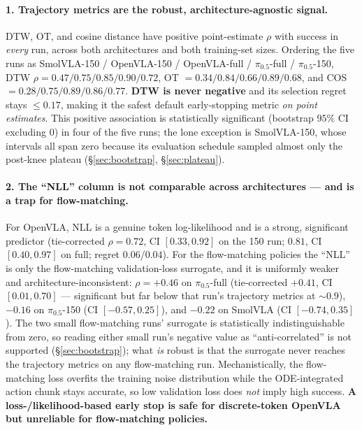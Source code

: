 \documentclass[11pt]{article}
\begin{document}
\paragraph{1. Trajectory metrics are the robust, architecture-agnostic signal.}
DTW, OT, and cosine distance have positive point-estimate $\rho$ with success in \emph{every} run, across
both architectures and both training-set sizes. Ordering the five runs as
SmolVLA-150 / OpenVLA-150 / OpenVLA-full / $\pi_{0.5}$-full / $\pi_{0.5}$-150,
DTW $\rho = 0.47/0.75/0.85/0.90/0.72$, OT $= 0.34/0.84/0.66/0.89/0.68$, and
COS $= 0.28/0.75/0.89/0.86/0.77$. \textbf{DTW is never negative} and its selection regret stays
$\le 0.17$, making it the safest default early-stopping metric \emph{on point estimates}. This positive
association is statistically significant (bootstrap $95\%$ CI excluding $0$) in four of the five runs;
the lone exception is SmolVLA-150, whose intervals all span zero because its evaluation schedule sampled
almost only the post-knee plateau (\S\ref{sec:bootstrap}, \S\ref{sec:plateau}).

\paragraph{2. The ``NLL'' column is not comparable across architectures --- and is a trap for
flow-matching.}
For OpenVLA, NLL is a genuine token log-likelihood and is a strong, significant predictor (tie-corrected
$\rho{=}0.72$, CI $[0.33,0.92]$ on the 150 run; $0.81$, CI $[0.40,0.97]$ on full; regret $0.06$/$0.04$).
For the flow-matching policies the ``NLL'' is only the flow-matching validation-loss surrogate, and it is
uniformly weaker and architecture-inconsistent: $\rho{=}{+}0.46$ on $\pi_{0.5}$-full (tie-corrected
${+}0.41$, CI $[0.01,0.70]$ --- significant but far below that run's trajectory metrics at $\sim\!0.9$),
${-}0.16$ on $\pi_{0.5}$-150 (CI $[-0.57,0.25]$), and $-0.22$ on SmolVLA (CI $[-0.74,0.35]$). The two small
flow-matching runs' surrogate is statistically indistinguishable from zero, so reading either small run's
negative value as ``anti-correlated'' is not supported (\S\ref{sec:bootstrap}); what \emph{is} robust is that the
surrogate never reaches the trajectory metrics on any flow-matching run. Mechanistically, the
flow-matching loss overfits the training noise distribution while the ODE-integrated action chunk stays
accurate, so low validation loss does \emph{not} imply high success.
\textbf{A loss-/likelihood-based early stop is safe for discrete-token OpenVLA but unreliable for
flow-matching policies.}
\end{document}
